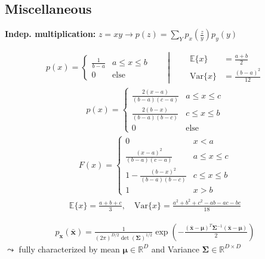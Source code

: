 \subsection{Miscellaneous}
    \textbf{Indep. multiplication:} $z = xy \to p(z) = \sum_{Y} p_x(\frac{z}{y})p_y(y)$ \\
    
    \begin{align*}
        p(x) = \begin{cases}
            \frac{1}{b-a} & a \leq x \leq b \\
            0 & \mathrm{else}
        \end{cases}
        \qquad\left\lvert\qquad
        \begin{aligned}
            \mathbb{E}\{x\} &= \textstyle\frac{a+b}{2} \\
            \mathrm{Var}\{x\} &= \textstyle\frac{(b-a)^2}{12}
        \end{aligned}
        \right.
    \end{align*}
    \begin{align*}
        p(x) = \begin{cases}
            \frac{2(x-a)}{(b-a)(c-a)} & a \leq x \leq c \\
            \frac{2(b-x)}{(b-a)(b-c)} & c \leq x \leq b \\
            0 & \mathrm{else}
        \end{cases}
    \end{align*}
    \begin{align*}
        F(x) = \begin{cases}
            0 & x < a \\
            \frac{(x-a)^2}{(b-a)(c-a)} & a \leq x \leq c \\
            1-\frac{(b-x)^2}{(b-a)(b-c)} & c \leq x \leq b \\
            1 & x > b
        \end{cases}
    \end{align*}
    \begin{align*}
            \mathbb{E}\{x\} = \textstyle\frac{a+b+c}{3}, \quad
            \mathrm{Var}\{x\} = \textstyle\frac{a^2+b^2+c^2-ab-ac-bc}{18}
    \end{align*}

    \begin{align*}
        p_{\mathbf{x}}(\mathbf{\bar{x}}) = \frac{1}{(2\pi)^{D/2} \det(\mathbf{\Sigma})^{1/2}}\exp\left(-\frac{(\mathbf{\bar{x}}-\boldsymbol{\mu})^T\mathbf{\Sigma}^{-1}(\mathbf{\bar{x}}-\boldsymbol{\mu})}{2}\right)
    \end{align*}
    $\leadsto$ fully characterized by mean $\boldsymbol{\mu} \in \mathbb{R}^D$ and Variance $\boldsymbol{\Sigma} \in \mathbb{R}^{D\times D}$\\

